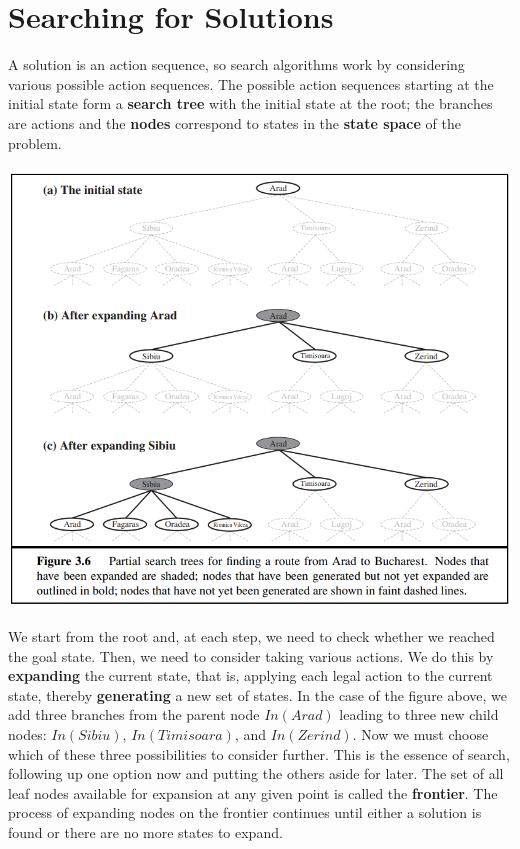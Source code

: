 \section{Searching for Solutions}
A solution is an action sequence, so search algorithms work by considering various possible action sequences. The possible action sequences starting at the initial state form a \textbf{search tree} with the initial state at the root; the branches are actions and the \textbf{nodes} correspond to states in the \textbf{state space} of the problem.
\begin{center}
    \includegraphics[scale=0.8]{images/search tree.png}
\end{center}
We start from the root and, at each step, we need to check whether we reached the goal state. Then, we need to consider taking various actions. We do this by \textbf{expanding} the current state, that is, applying each legal action to the current state, thereby \textbf{generating} a new set of states. In the case of the figure above, we add three branches from the parent node $In(Arad)$ leading to three new child nodes: $In(Sibiu)$, $In(Timisoara)$, and $In(Zerind)$. Now we must choose which of these three possibilities to consider further.\newline\newline
This is the essence of search, following up one option now and putting the others aside for later. The set of all leaf nodes available for expansion at any given point is called the \textbf{frontier}. The process of expanding nodes on the frontier continues until either a solution is found or there are no more states to expand.
